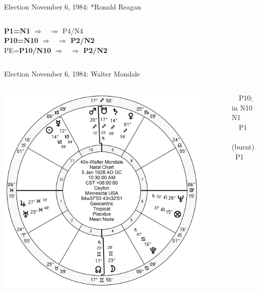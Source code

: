 \begin{frame}[t]{Election November 6, 1984: *Ronald Reagan}
\begin{columns}[T, onlytextwidth]
\textbf{\dgreen P1=N1} 
	$\Rightarrow$ \Saturn\, $\Rightarrow$ P4/N4\\
\textbf{\red P10=N10}
	$\Rightarrow$ \Venus\, $\Rightarrow$ \textbf{\red P2/N2}\\
PE=\textbf{\red P10/N10}
	 $\Rightarrow$ \Venus\, $\Rightarrow$ \textbf{\red P2/N2}

\end{columns}
\end{frame}

\begin{frame}[t]{Election November 6, 1984: Walter Mondale}
\small
\begin{columns}[T, onlytextwidth]
\vspace{-1em}
{\includegraphics[width=0.9\textwidth]{charts/Mondale.png}}
\fontsize{8pt}{9pt}\selectfont

\Mars\, \Trine\, P10; in N10 \Square\, N1 \\
\Sun\, \Sextile\, P1 \\
\Mercury\, (burnt) \Sextile\, P1 


\end{columns}
\end{frame}
